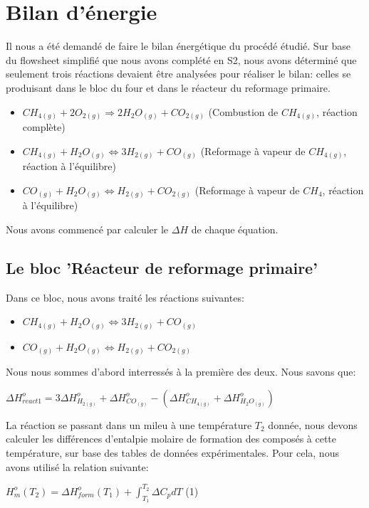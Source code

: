 \documentclass[11pt,a4paper]{report}
\author{Groupe 1246}
\begin{document}
\section*{Bilan d'énergie}
Il nous a été demandé de faire le bilan énergétique du procédé étudié. 
Sur base du flowsheet simplifié que nous avons complété en S2, nous avons déterminé que seulement trois réactions 
devaient être analysées pour réaliser le bilan: celles se produisant dans le bloc du four et dans le réacteur du 
reformage primaire.
\begin{itemize}
\item{$CH_{4(g)} + 2O_{2(g)} \Rightarrow 2H_{2}O_{(g)} + CO_{2(g)}$ (Combustion de $CH_{4(g)}$, réaction complète)}
\item{$CH_{4(g)} + H_{2}O_{(g)} \Leftrightarrow 3H_{2(g)} + CO_{(g)}$ (Reformage à vapeur de $CH_{4(g)}$, réaction à l'équilibre)}
\item{$CO_{(g)} + H_{2}O_{(g)} \Leftrightarrow H_{2(g)} + CO_{2(g)}$ (Reformage à vapeur de $CH_{4}$, réaction à l'équilibre)}
\end{itemize}

Nous avons commencé par calculer le $\Delta H$ de chaque équation.

\subsection*{Le bloc 'Réacteur de reformage primaire'}

Dans ce bloc, nous avons traité les réactions suivantes:
\begin{itemize}
\item{$CH_{4(g)} + H_{2}O_{(g)} \Leftrightarrow 3H_{2(g)} + CO_{(g)}$}
\item{$CO_{(g)} + H_{2}O_{(g)} \Leftrightarrow H_{2(g)} + CO_{2(g)}$}
\end{itemize}

Nous nous sommes d'abord interressés à la première des deux.
Nous savons que:

$\Delta H^o_{react1}=3\Delta H^o_{H_{2(g)}} + \Delta H^o_{CO_{(g)}} - (\Delta H^o_{CH_{4(g)}} + \Delta H^o_{H_{2}O_{(g)}})$

La réaction se passant dans un mileu à une température $T_2$ donnée, nous devons calculer les différences d'entalpie
molaire de formation des composés à cette température, sur base des tables de données expérimentales. Pour cela, nous 
avons utilisé la relation suivante:

$H^o_m(T_2)=\Delta H^o_{form}(T_1)+\int_{T_1}^{T_2} \Delta C_pdT$   (1)
\end{document}
